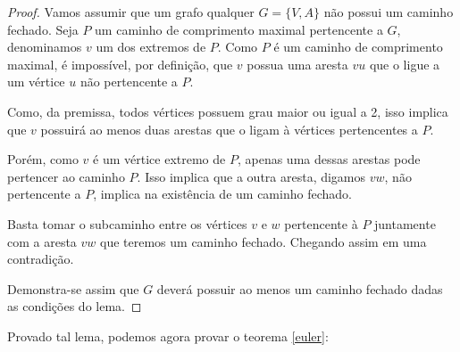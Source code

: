 \documentclass{article}
\begin{document}
\begin{proof}
	Vamos assumir que um grafo qualquer $G = \{V, A\}$ não possui um caminho fechado. 
	Seja $P$ um caminho de comprimento maximal pertencente a $G$, denominamos $v$ um dos extremos de $P$. 
	Como $P$ é um caminho de comprimento maximal, é impossível, por definição, que $v$ possua uma aresta $vu$ que o ligue a um vértice $u$ não pertencente a $P$.
	
	Como, da premissa, todos vértices possuem grau maior ou igual a 2, isso implica que $v$ possuirá ao menos duas arestas que o ligam à vértices pertencentes a $P$.

	Porém, como $v$ é um vértice extremo de $P$, apenas uma dessas arestas pode pertencer ao caminho $P$. Isso implica que a outra aresta, digamos $vw$, não pertencente a $P$, implica na existência de um caminho fechado.

	Basta tomar o subcaminho entre os vértices $v$ e $w$ pertencente à $P$ juntamente com a aresta $vw$ que teremos um caminho fechado. Chegando assim em uma contradição.

	Demonstra-se assim que $G$ deverá possuir ao menos um caminho fechado dadas as condições do lema.
\end{proof}

Provado tal lema, podemos agora provar o teorema \ref{euler}:
\end{document}

